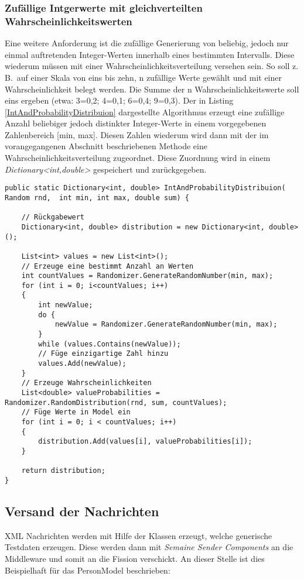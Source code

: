 \subsubsection{Zufällige Intgerwerte mit gleichverteilten Wahrscheinlichkeitswerten}
Eine weitere Anforderung ist die zufällige Generierung von beliebig, jedoch nur einmal auftretenden Integer-Werten innerhalb eines bestimmten Intervalls. Diese wiederum müssen mit einer Wahrscheinlichkeitsverteilung versehen sein. So soll z.\,B.\ auf einer Skala von eins bis zehn, n zufällige Werte gewählt und mit einer Wahrscheinlichkeit belegt werden. Die Summe der n Wahrscheinlichkeitswerte soll eins ergeben (etwa: 3=0,2; 4=0,1; 6=0,4; 9=0,3). Der in Listing \ref{IntAndProbabilityDistribuion} dargestellte Algorithmus erzeugt eine zufällige Anzahl beliebiger jedoch distinkter Integer-Werte in einem vorgegebenen Zahlenbereich [min, max]. Diesen Zahlen wiederum wird dann mit der im vorangegangenen Abschnitt beschriebenen Methode eine Wahrscheinlichkeitsverteilung zugeordnet. Diese Zuordnung wird in einem \emph{Dictionary<int,double>} gespeichert und zurückgegeben.
\begin{lstlisting}
public static Dictionary<int, double> IntAndProbabilityDistribuion( Random rnd,  int min, int max, double sum) {

	// Rückgabewert
    Dictionary<int, double> distribution = new Dictionary<int, double>();

    List<int> values = new List<int>();
    // Erzeuge eine bestimmt Anzahl an Werten
    int countValues = Randomizer.GenerateRandomNumber(min, max);
    for (int i = 0; i<countValues; i++)
    {
        int newValue;
        do {
            newValue = Randomizer.GenerateRandomNumber(min, max);
        }
        while (values.Contains(newValue));
        // Füge einzigartige Zahl hinzu
        values.Add(newValue);
    }
    // Erzeuge Wahrscheinlichkeiten
    List<double> valueProbabilities = Randomizer.RandomDistribution(rnd, sum, countValues);
    // Füge Werte in Model ein
    for (int i = 0; i < countValues; i++)
    {
        distribution.Add(values[i], valueProbabilities[i]);
    }

    return distribution;
}
\end{lstlisting}




\subsection{Versand der Nachrichten}
XML Nachrichten werden mit Hilfe der Klassen erzeugt, welche generische Testdaten erzeugen. Diese werden dann mit \emph{Semaine Sender Components} an die Middleware und somit an die Fission verschickt.
An dieser Stelle ist dies Beispielhaft für das PersonModel beschrieben:

